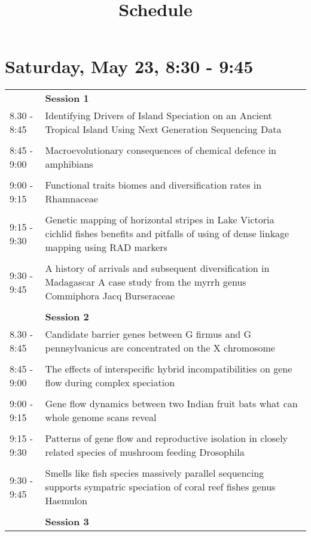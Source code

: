 \documentclass{article}
\title{Schedule}
\date{}
\begin{document}
\maketitle{}

\section{Saturday, May 23, 8:30 - 9:45}
\begin{longtabu} to \textwidth {lX}
 & \textbf{Session 1} \\ 

8.30 - 8:45 & Identifying Drivers of Island Speciation on an Ancient Tropical Island Using Next Generation Sequencing Data \\ 
 &  \\ 
8:45 - 9:00 & Macroevolutionary consequences of chemical defence in amphibians \\ 
 &  \\ 
9:00 - 9:15 & Functional traits  biomes  and diversification rates in Rhamnaceae \\ 
 &  \\ 
9:15 - 9:30 & Genetic mapping of horizontal stripes in Lake Victoria cichlid fishes  benefits and pitfalls of using of dense linkage mapping using RAD markers \\ 
 &  \\ 
9:30 - 9:45 & A history of arrivals and subsequent diversification in Madagascar  A case study from the myrrh genus  Commiphora Jacq  Burseraceae \\ 
 &  \\ 
 & \textbf{Session 2} \\ 

8.30 - 8:45 & Candidate barrier genes between G firmus and G pennsylvanicus are concentrated on the X chromosome \\ 
 &  \\ 
8:45 - 9:00 & The effects of interspecific hybrid incompatibilities on gene flow during complex speciation \\ 
 &  \\ 
9:00 - 9:15 & Gene flow dynamics between two Indian fruit bats  what can whole genome scans reveal \\ 
 &  \\ 
9:15 - 9:30 & Patterns of gene flow and reproductive isolation in closely related species of mushroom feeding Drosophila \\ 
 &  \\ 
9:30 - 9:45 & Smells like fish species  massively parallel sequencing supports sympatric speciation of coral reef fishes  genus  Haemulon \\ 
 &  \\ 
 & \textbf{Session 3} \\ 


\end{longtabu}
\end{document}
